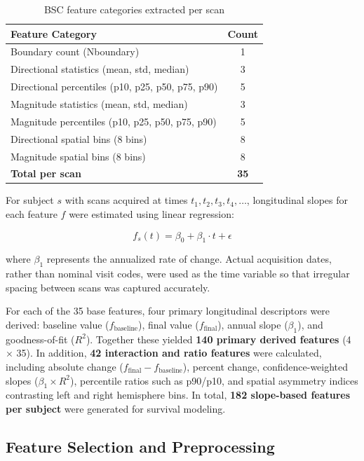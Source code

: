 \documentclass[blue]{ludusofficial}
\begin{document}
\begin{table}[htbp]
\centering
\caption{BSC feature categories extracted per scan}
\label{tab:bsc-features}
\begin{tabular}{lc}
\hline
\textbf{Feature Category} & \textbf{Count} \\
\hline
Boundary count (Nboundary) & 1 \\
Directional statistics (mean, std, median) & 3 \\
Directional percentiles (p10, p25, p50, p75, p90) & 5 \\
Magnitude statistics (mean, std, median) & 3 \\
Magnitude percentiles (p10, p25, p50, p75, p90) & 5 \\
Directional spatial bins (8 bins) & 8 \\
Magnitude spatial bins (8 bins) & 8 \\
\hline
\textbf{Total per scan} & \textbf{35} \\
\hline
\end{tabular}
\end{table}

For subject $s$ with scans acquired at times $t_1, t_2, t_3, t_4, \ldots$, longitudinal slopes for each feature $f$ were estimated using linear regression:

\begin{equation}
    f_s(t) = \beta_0 + \beta_1 \cdot t + \epsilon
\end{equation}

where $\beta_1$ represents the annualized rate of change. Actual acquisition dates, rather than nominal visit codes, were used as the time variable so that irregular spacing between scans was captured accurately.

For each of the 35 base features, four primary longitudinal descriptors were derived: baseline value ($f_{\text{baseline}}$), final value ($f_{\text{final}}$), annual slope ($\beta_1$), and goodness-of-fit ($R^2$). Together these yielded \textbf{140 primary derived features} (4 $\times$ 35). In addition, \textbf{42 interaction and ratio features} were calculated, including absolute change ($f_{\text{final}} - f_{\text{baseline}}$), percent change, confidence-weighted slopes ($\beta_1 \times R^2$), percentile ratios such as p90/p10, and spatial asymmetry indices contrasting left and right hemisphere bins. In total, \textbf{182 slope-based features per subject} were generated for survival modeling.

\subsection{Feature Selection and Preprocessing}
\end{document}
